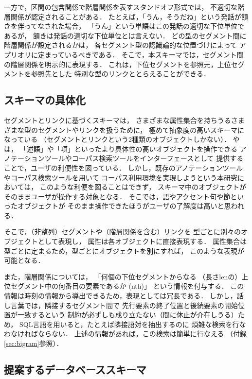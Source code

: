 \documentclass[japanese]{jnlp_1.4}
\begin{document}
一方で，区間の包含関係で階層関係を表すスタンドオフ形式では，
不適切な階層関係が認定されることがある．
たとえば，「うん，そうだね」という発話が頷きを伴ってなされた場合，
「うん」という単語はこの発話の適切な下位単位であるが，
頷きは発話の適切な下位単位とは言えない．
どの型のセグメント間に階層関係が設定されるかは，
各セグメント型の認識論的な位置づけによって
アプリオリに定まっているべきである．
そこで，本スキーマでは，セグメント間の階層関係を明示的に表現する．
これは，下位セグメントを参照元，上位セグメントを参照先とした
特別な型のリンクととらえることができる．


\subsection{スキーマの具体化}
\label{sec:DB:practical}

セグメントとリンクに基づくスキーマは，
さまざまな属性集合を持ちうるさまざまな型のセグメントやリンクを扱うために，
極めて抽象度の高いスキーマになっている
（セグメントとリンクという2種類のオブジェクトしかない）．
やは，
「述語」や「項」といったより具体性の高いオブジェクトを操作できる
アノテーションツールやコーパス検索ツールをインターフェースとして
提供することで，ユーザの利便性を図っている．
しかし，既存のアノテーションツールやコーパス検索ツールを用いて
コーパス利用環境を実現しようという本研究においては，
このような利便を図ることはできず，
スキーマ中のオブジェクトがそのままユーザが操作する対象となる．
そこでは，語やアクセント句や節といったオブジェクトが
そのまま操作できたほうがユーザの了解度は高いと思われる．

そこで，（非整列）セグメントや（階層関係を含む）リンクを
型ごとに別々のオブジェクトとして表現し，
属性は各オブジェクトに直接表現する．
属性集合は型ごとに定まるため，型ごとにオブジェクトを別にすれば，
このような表現が可能となる．

また，階層関係については，
「何個の下位セグメントからなる
（長さlenの）上位セグメント中の何番目の要素であるか (nth)」
という情報を付与する．
この情報は時刻の情報から導出できるため，表現としては冗長である．
しかし，話し言葉では，隣接するセグメント間で
先行要素の終了位置と後続要素の開始位置が一致するという
制約が必ずしも成り立たない（間に休止が介在しうる）ため，
SQL言語を用いると，たとえば隣接語対を抽出するのに
煩雑な検索を行なわなければならない．
上述の情報があれば，この検索は簡単に行なえる
（付録\ref{sec:bigram}参照）．


\subsection{提案するデータベーススキーマ}
\end{document}
